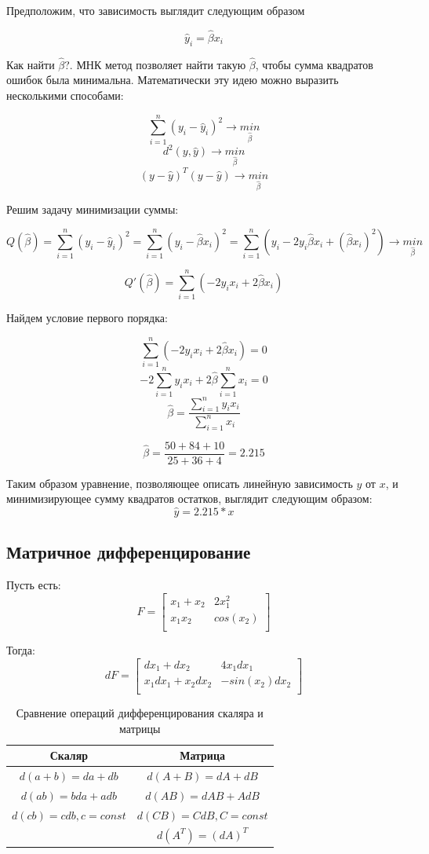 \documentclass[12pt]{article} %
\theoremstyle{definition} %
\def \hb{\hat{\beta}}
\def \hy{\hat{y}}
\begin{document}
Предположим, что зависимость выглядит следующим образом

\[
\hy_i = \hb x_i
\]

Как найти $\hb$?. МНК метод позволяет найти такую $\hb$, чтобы сумма квадратов ошибок была минимальна. Математически эту идею можно выразить несколькими способами:

\[
\sum_{i=1}^n \left( y_i - \hy_i \right)^2 \rightarrow \underset{\hb}{min}
\]
\[
d^2(y,\hy) \rightarrow \underset{\hb}{min}
\]
\[
\left( y-\hy\right)^T\left( y-\hy\right) \rightarrow \underset{\hb}{min}
\]

Решим задачу минимизации суммы:

\[
Q(\hb) = \sum_{i=1}^n \left( y_i - \hy_i \right)^2 = 
\sum_{i=1}^n \left( y_i - \hb x_i \right)^2 = 
\sum_{i=1}^n \left( y_i - 2y_i\hb x_i + (\hb x_i)^2 \right)\rightarrow \underset{\hb}{min}
\]

\[
Q'(\hb) = \sum_{i=1}^n \left( - 2y_i x_i + 2\hb x_i \right) 
\]

Найдем условие первого порядка:

\[
\sum_{i=1}^n \left( - 2y_i x_i + 2\hb x_i \right) = 0
\]
\[
-2\sum_{i=1}^n y_i x_i + 2\hb \sum_{i=1}^n x_i  = 0
\]
\[
\hb   = \frac{\sum_{i=1}^n y_i x_i}{\sum_{i=1}^n x_i}
\]

\[
\hb   = \frac{50+84+10}{25+36+4} = 2.215
\]

Таким образом уравнение, позволяющее описать линейную зависимость $y$ от $x$, и минимизирующее сумму квадратов остатков, выглядит следующим образом:
\[
\hy = 2.215*x 
\]

\subsection{Матричное дифференцирование}

Пусть есть:
\[
F =  \begin{bmatrix}
        x_1 + x_2  & 2x_1^2 \\
        x_1x_2    & cos(x_2)\\
         \end{bmatrix}
\]

Тогда: 
\[
dF =  \begin{bmatrix}
        dx_1 + dx_2  & 4x_1dx_1 \\
        x_1dx_1+x_2dx_2    & -sin(x_2)dx_2\\
         \end{bmatrix}
\]

\begin{table}[h!]
    \centering
    \begin{tabular}{c|c}
        \hline
        Скаляр & Матрица  \\
        \hline
        $d(a+b) = da + db$ & $d(A+B) = dA + dB$\\
        $d(ab) = bda + adb$ & $d(AB) = dAB + AdB$\\
        $d(cb) = cdb, c=const$ & $d(CB) = CdB, C=const$ \\
        & $d(A^T)=(dA)^T$
    \end{tabular}
    \caption{Сравнение операций дифференцирования скаляра и матрицы}
    \label{third_table}
\end{table}
\end{document}
